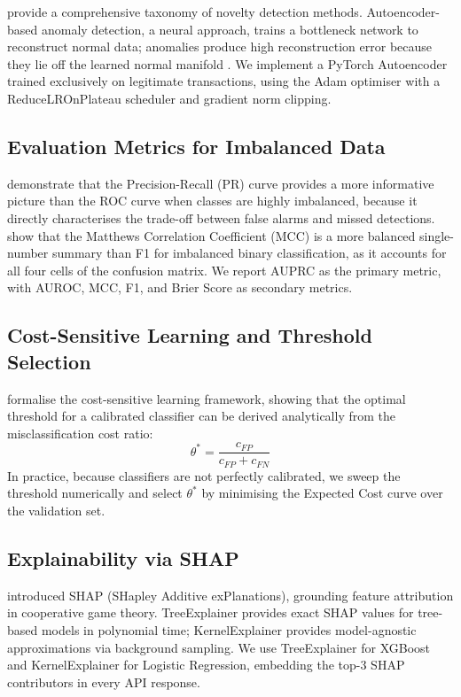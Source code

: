 \citet{pimentel2014review} provide a comprehensive taxonomy of novelty
detection methods. Autoencoder-based anomaly detection, a neural approach,
trains a bottleneck network to reconstruct normal data; anomalies
produce high reconstruction error because they lie off the learned normal
manifold \citep{pimentel2014review}.
We implement a PyTorch Autoencoder trained exclusively on legitimate
transactions, using the Adam optimiser \citep{kingma2015adam} with
a ReduceLROnPlateau scheduler and gradient norm clipping.

\subsection{Evaluation Metrics for Imbalanced Data}

\citet{davis2006precision} demonstrate that the Precision-Recall (PR) curve
provides a more informative picture than the ROC curve when classes are
highly imbalanced, because it directly characterises the trade-off between
false alarms and missed detections.
\citet{chicco2020mcc} show that the Matthews Correlation Coefficient (MCC)
is a more balanced single-number summary than F1 for imbalanced binary
classification, as it accounts for all four cells of the confusion matrix.
We report AUPRC as the primary metric, with AUROC, MCC, F1, and Brier Score
as secondary metrics.

\subsection{Cost-Sensitive Learning and Threshold Selection}

\citet{elkan2001cost} formalise the cost-sensitive learning framework,
showing that the optimal threshold for a calibrated classifier can be
derived analytically from the misclassification cost ratio:
\begin{equation}
    \theta^* = \frac{c_{FP}}{c_{FP} + c_{FN}}
    \label{eq:elkan_threshold}
\end{equation}
In practice, because classifiers are not perfectly calibrated, we sweep
the threshold numerically and select $\theta^*$ by minimising the Expected
Cost curve over the validation set.

\subsection{Explainability via SHAP}

\citet{lundberg2017shap} introduced SHAP (SHapley Additive exPlanations),
grounding feature attribution in cooperative game theory.
TreeExplainer provides exact SHAP values for tree-based models in
polynomial time; KernelExplainer provides model-agnostic approximations
via background sampling.
We use TreeExplainer for XGBoost and KernelExplainer for Logistic Regression,
embedding the top-3 SHAP contributors in every API response.

